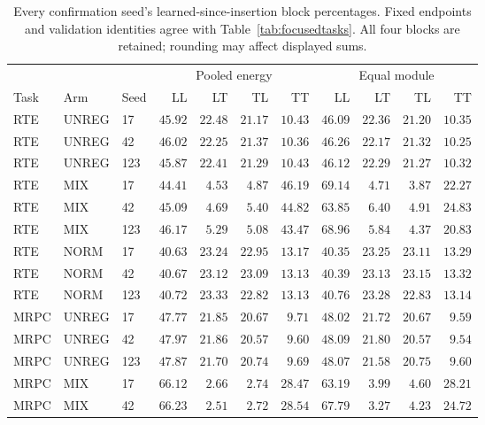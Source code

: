 \documentclass{article}
\begin{document}
\begin{table}[t]
\centering
\caption{Every confirmation seed's learned-since-insertion block percentages. Fixed endpoints and validation identities agree with Table~\ref{tab:focusedtasks}. All four blocks are retained; rounding may affect displayed sums.}
\label{tab:learnedseeds}
\begin{adjustbox}{max width=\linewidth}
\begin{tabular}{lllrrrrrrrr}
\toprule
&&&\multicolumn{4}{c}{Pooled energy}&\multicolumn{4}{c}{Equal module}\\
Task & Arm & Seed & LL & LT & TL & TT & LL & LT & TL & TT\\
\midrule
RTE & UNREG & 17 & $45.92$ & $22.48$ & $21.17$ & $10.43$ & $46.09$ & $22.36$ & $21.20$ & $10.35$ \\
RTE & UNREG & 42 & $46.02$ & $22.25$ & $21.37$ & $10.36$ & $46.26$ & $22.17$ & $21.32$ & $10.25$ \\
RTE & UNREG & 123 & $45.87$ & $22.41$ & $21.29$ & $10.43$ & $46.12$ & $22.29$ & $21.27$ & $10.32$ \\
RTE & MIX & 17 & $44.41$ & $4.53$ & $4.87$ & $46.19$ & $69.14$ & $4.71$ & $3.87$ & $22.27$ \\
RTE & MIX & 42 & $45.09$ & $4.69$ & $5.40$ & $44.82$ & $63.85$ & $6.40$ & $4.91$ & $24.83$ \\
RTE & MIX & 123 & $46.17$ & $5.29$ & $5.08$ & $43.47$ & $68.96$ & $5.84$ & $4.37$ & $20.83$ \\
RTE & NORM & 17 & $40.63$ & $23.24$ & $22.95$ & $13.17$ & $40.35$ & $23.25$ & $23.11$ & $13.29$ \\
RTE & NORM & 42 & $40.67$ & $23.12$ & $23.09$ & $13.13$ & $40.39$ & $23.13$ & $23.15$ & $13.32$ \\
RTE & NORM & 123 & $40.72$ & $23.33$ & $22.82$ & $13.13$ & $40.76$ & $23.28$ & $22.83$ & $13.14$ \\
\midrule
MRPC & UNREG & 17 & $47.77$ & $21.85$ & $20.67$ & $9.71$ & $48.02$ & $21.72$ & $20.67$ & $9.59$ \\
MRPC & UNREG & 42 & $47.97$ & $21.86$ & $20.57$ & $9.60$ & $48.09$ & $21.80$ & $20.57$ & $9.54$ \\
MRPC & UNREG & 123 & $47.87$ & $21.70$ & $20.74$ & $9.69$ & $48.07$ & $21.58$ & $20.75$ & $9.60$ \\
MRPC & MIX & 17 & $66.12$ & $2.66$ & $2.74$ & $28.47$ & $63.19$ & $3.99$ & $4.60$ & $28.21$ \\
MRPC & MIX & 42 & $66.23$ & $2.51$ & $2.72$ & $28.54$ & $67.79$ & $3.27$ & $4.23$ & $24.72$ \\

\end{tabular}
\end{adjustbox}
\end{table}
\end{document}
